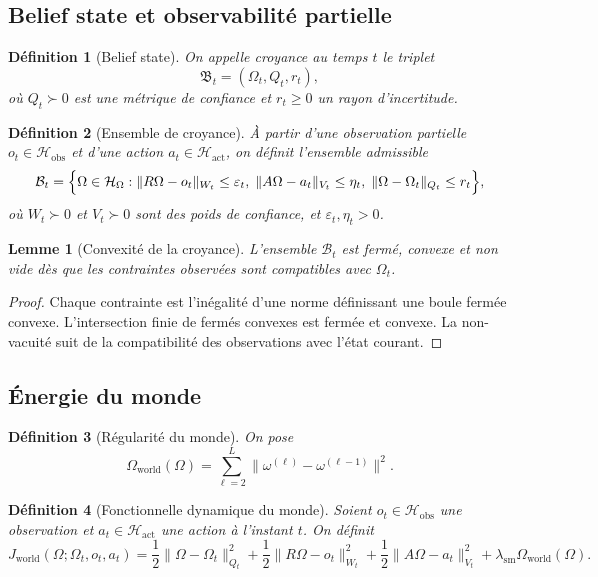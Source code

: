 \documentclass[11pt,a4paper]{article}
\newtheorem{definition}{Définition}[section]
\newtheorem{lemma}{Lemme}[section]
\newcommand{\Hh}{\mathcal H}
\newcommand{\1}{\mathbf 1}
\begin{document}
\subsection{Belief state et observabilité partielle}

\begin{definition}[Belief state]
On appelle croyance au temps \(t\) le triplet
\[
\mathfrak B_t=(\Omega_t,Q_t,r_t),
\]
où \(Q_t\succ 0\) est une métrique de confiance et \(r_t\ge 0\) un rayon d'incertitude.
\end{definition}

\begin{definition}[Ensemble de croyance]
À partir d'une observation partielle \(o_t\in\Hh_{\mathrm{obs}}\) et d'une action \(a_t\in\Hh_{\mathrm{act}}\), on définit l'ensemble admissible
\[
\mathcal B_t
=
\Bigl\{
\Omega\in\Hh_\Omega:
\|R\Omega-o_t\|_{W_t}\le \varepsilon_t,\;
\|A\Omega-a_t\|_{V_t}\le \eta_t,\;
\|\Omega-\Omega_t\|_{Q_t}\le r_t
\Bigr\},
\]
où \(W_t\succ 0\) et \(V_t\succ 0\) sont des poids de confiance, et \(\varepsilon_t,\eta_t>0\).
\end{definition}

\begin{lemma}[Convexité de la croyance]
L'ensemble \(\mathcal B_t\) est fermé, convexe et non vide dès que les contraintes observées sont compatibles avec \(\Omega_t\).
\end{lemma}

\begin{proof}
Chaque contrainte est l'inégalité d'une norme définissant une boule fermée convexe.  
L'intersection finie de fermés convexes est fermée et convexe.  
La non-vacuité suit de la compatibilité des observations avec l'état courant.
\end{proof}

\subsection{Énergie du monde}

\begin{definition}[Régularité du monde]
On pose
\[
\Omega_{\mathrm{world}}(\Omega)
=
\sum_{\ell=2}^{L}\|\omega^{(\ell)}-\omega^{(\ell-1)}\|^2.
\]
\end{definition}

\begin{definition}[Fonctionnelle dynamique du monde]
Soient \(o_t\in\Hh_{\mathrm{obs}}\) une observation et \(a_t\in\Hh_{\mathrm{act}}\) une action à l'instant \(t\).  
On définit
\[
J_{\mathrm{world}}(\Omega;\Omega_t,o_t,a_t)
=
\frac12\|\Omega-\Omega_t\|_{Q_t}^2
+
\frac12\|R\Omega-o_t\|_{W_t}^2
+
\frac12\|A\Omega-a_t\|_{V_t}^2
+
\lambda_{\mathrm{sm}}\Omega_{\mathrm{world}}(\Omega).
\]
\end{definition}
\end{document}
